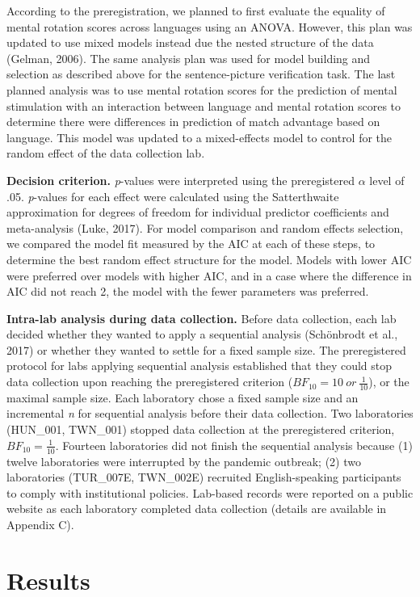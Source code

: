 \documentclass[
  man,floatsintext]{apa7}
\begin{document}
According to the preregistration, we planned to first evaluate the
equality of mental rotation scores across languages using an ANOVA.
However, this plan was updated to use mixed models instead due the
nested structure of the data (Gelman, 2006). The same
analysis plan was used for model building and selection as described
above for the sentence-picture verification task. The last planned
analysis was to use mental rotation scores for the prediction of mental
stimulation with an interaction between language and mental rotation
scores to determine there were differences in prediction of match
advantage based on language. This model was updated to a mixed-effects
model to control for the random effect of the data collection lab.

\textbf{Decision criterion.} \emph{p}-values were interpreted using the
preregistered \(\alpha\) level of .05. \emph{p}-values for each effect were
calculated using the Satterthwaite approximation for degrees of freedom
for individual predictor coefficients and meta-analysis
(Luke, 2017). For model comparison and random
effects selection, we compared the model fit measured by the AIC at each
of these steps, to determine the best random effect structure for the
model. Models with lower AIC were preferred over models with higher AIC,
and in a case where the difference in AIC did not reach 2, the model
with the fewer parameters was preferred.

\textbf{Intra-lab analysis during data collection.} Before data collection,
each lab decided whether they wanted to apply a sequential analysis
(Schönbrodt et al., 2017) or whether they wanted to
settle for a fixed sample size. The preregistered protocol for labs
applying sequential analysis established that they could stop data
collection upon reaching the preregistered criterion
(\(BF_{10} = 10\ or\ \frac{1}{10}\)), or the maximal sample size. Each
laboratory chose a fixed sample size and an incremental \emph{n} for
sequential analysis before their data collection. Two laboratories
(HUN\_001, TWN\_001) stopped data collection at the preregistered
criterion, \(BF_{10} = \frac{1}{10}\). Fourteen laboratories did not
finish the sequential analysis because (1) twelve laboratories were
interrupted by the pandemic outbreak; (2) two laboratories (TUR\_007E,
TWN\_002E) recruited English-speaking participants to comply with
institutional policies. Lab-based records were reported on a public
website as each laboratory completed data collection (details are
available in Appendix C).

\hypertarget{results}{%
\section{Results}\label{results}}
\end{document}

